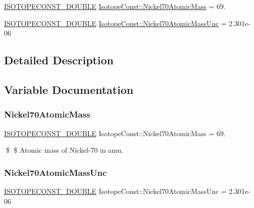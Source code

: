 \begin{DoxyCompactItemize}
\item 
\mbox{\hyperlink{group___isotope_const-_macros_ga8f45a7272ce02c0b4c65c44636ed719a}{I\+S\+O\+T\+O\+P\+E\+C\+O\+N\+S\+T\+\_\+\+D\+O\+U\+B\+LE}} \mbox{\hyperlink{group___isotope_const-_nickel-_ni70_gac31c4d4f2c832fea77f6453862368fe8}{Isotope\+Const\+::\+Nickel70\+Atomic\+Mass}} = 69.
\item 
\mbox{\hyperlink{group___isotope_const-_macros_ga8f45a7272ce02c0b4c65c44636ed719a}{I\+S\+O\+T\+O\+P\+E\+C\+O\+N\+S\+T\+\_\+\+D\+O\+U\+B\+LE}} \mbox{\hyperlink{group___isotope_const-_nickel-_ni70_ga9f91ad8b937a29ed94745d183f076256}{Isotope\+Const\+::\+Nickel70\+Atomic\+Mass\+Unc}} = 2.\+301e-\/06
\end{DoxyCompactItemize}


\subsection{Detailed Description}


\subsection{Variable Documentation}
\mbox{\label{group___isotope_const-_nickel-_ni70_gac31c4d4f2c832fea77f6453862368fe8}} 
\subsubsection{\texorpdfstring{Nickel70\+Atomic\+Mass}{Nickel70AtomicMass}}
{\footnotesize\ttfamily \mbox{\hyperlink{group___isotope_const-_macros_ga8f45a7272ce02c0b4c65c44636ed719a}{I\+S\+O\+T\+O\+P\+E\+C\+O\+N\+S\+T\+\_\+\+D\+O\+U\+B\+LE}} Isotope\+Const\+::\+Nickel70\+Atomic\+Mass = 69.}

\$ \$ Atomic mass of Nickel-\/70 in amu. \mbox{\label{group___isotope_const-_nickel-_ni70_ga9f91ad8b937a29ed94745d183f076256}} 
\subsubsection{\texorpdfstring{Nickel70\+Atomic\+Mass\+Unc}{Nickel70AtomicMassUnc}}
{\footnotesize\ttfamily \mbox{\hyperlink{group___isotope_const-_macros_ga8f45a7272ce02c0b4c65c44636ed719a}{I\+S\+O\+T\+O\+P\+E\+C\+O\+N\+S\+T\+\_\+\+D\+O\+U\+B\+LE}} Isotope\+Const\+::\+Nickel70\+Atomic\+Mass\+Unc = 2.\+301e-\/06}

